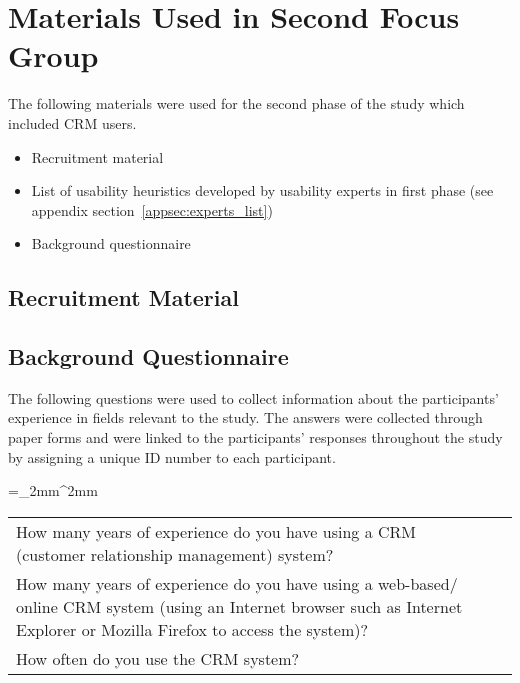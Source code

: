 \chapter{Materials Used in Second Focus Group}
\label{app:second_group}
The following materials were used for the second phase of the study which included CRM users.

\begin{itemize}
	\item Recruitment material
	\item List of usability heuristics developed by usability experts in first phase (see appendix section~\ref{appsec:experts_list})
	\item Background questionnaire
\end{itemize}

\section{Recruitment Material}


\section{Background Questionnaire}
The following questions were used to collect information about the participants' experience in fields relevant to the study. The answers were collected through paper forms and were linked to the participants' responses throughout the study by assigning a unique ID number to each participant.

\tabulinesep=_2mm^2mm
\begin{longtabu} to \textwidth {X[1, p] r}		
	How many years of experience do you have using a CRM (customer relationship management) system? & \underline{\makebox[1in]{}}\\	
	How many years of experience do you have using a web-based/ online CRM system (using an Internet browser such as Internet Explorer or Mozilla Firefox to access the system)? & \underline{\makebox[1in]{}} \\
	How often do you use the CRM system? & \underline{\makebox[1in]{}}
\end{longtabu}